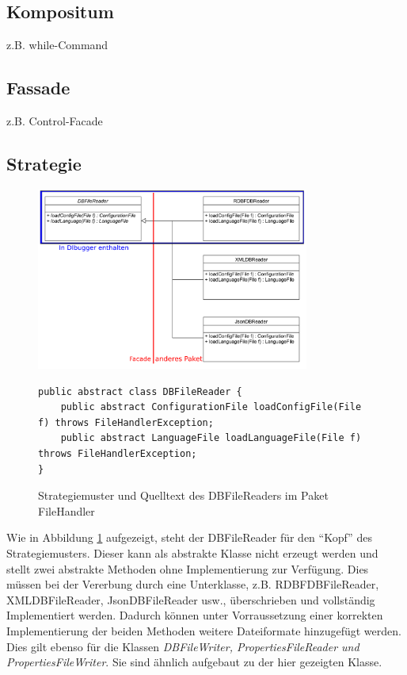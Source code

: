 \documentclass[parskip=full]{scrartcl}
\begin{document}
\subsection{Kompositum}
z.B. while-Command
\subsection{Fassade}
z.B. Control-Facade

\newpage
\subsection{Strategie}
\begin{figure}[!h]
\centering
\includegraphics[width=0.8\textwidth]{document_data/strategy_uml_d.pdf}
\begin{verbatim}
public abstract class DBFileReader {
    public abstract ConfigurationFile loadConfigFile(File f) throws FileHandlerException;
    public abstract LanguageFile loadLanguageFile(File f) throws FileHandlerException;
}
\end{verbatim}
\caption{Strategiemuster und Quelltext des DBFileReaders im Paket FileHandler}
\label{fig:strategy_fh}
\end{figure}
Wie in Abbildung \ref{fig:strategy_fh} aufgezeigt, steht der DBFileReader für den \enquote{Kopf} des Strategiemusters.
Dieser kann als abstrakte Klasse nicht erzeugt werden und stellt zwei abstrakte Methoden ohne Implementierung zur Verfügung.
Dies müssen bei der Vererbung durch eine Unterklasse, z.B. RDBFDBFileReader, XMLDBFileReader, JsonDBFileReader usw., überschrieben und vollständig Implementiert werden.
Dadurch können unter Vorraussetzung einer korrekten Implementierung der beiden Methoden weitere Dateiformate hinzugefügt werden.
Dies gilt ebenso für die Klassen \textit{DBFileWriter, PropertiesFileReader und PropertiesFileWriter}. Sie sind ähnlich aufgebaut zu der hier gezeigten Klasse.
\end{document}
